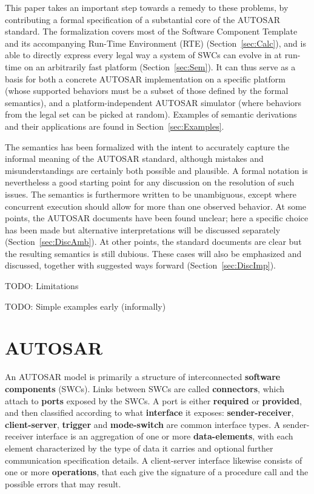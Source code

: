 \documentclass[twocolumn]{article}
\begin{document}
This paper takes an important step towards a remedy to these problems, by contributing a formal specification of a substantial core of the AUTOSAR standard. The formalization covers most of the Software Component Template and its accompanying Run-Time Environment (RTE) (Section~\ref{sec:Calc}), and is able to directly express every legal way a system of SWCs can evolve in at run-time on an arbitrarily fast platform (Section~\ref{sec:Sem}). It can thus serve as a basis for both a concrete AUTOSAR implementation on a specific platform (whose supported behaviors must be a subset of those defined by the formal semantics), and a platform-independent AUTOSAR simulator (where behaviors from the legal set can be picked at random). Examples of semantic derivations and their applications are found in Section~\ref{sec:Examples}.

The semantics has been formalized with the intent to accurately capture the informal meaning of the AUTOSAR standard, although mistakes and misunderstandings are certainly both possible and plausible. A formal notation is nevertheless a good starting point for any discussion on the resolution of such issues. The semantics is furthermore written to be unambiguous, except where concurrent execution should allow for more than one observed behavior. At some points, the AUTOSAR documents have been found unclear; here a specific choice has been made but alternative interpretations will be discussed separately (Section~\ref{sec:DiscAmb}). At other points, the standard documents are clear but the resulting semantics is still dubious. These cases will also be emphasized and discussed, together with suggested ways forward (Section~\ref{sec:DiscImp}).


TODO: Limitations

TODO: Simple examples early (informally)

\section{AUTOSAR}
\label{sec:autosar}

An AUTOSAR model is primarily a structure of interconnected {\bf software components} (SWCs). Links between SWCs are called {\bf connectors}, which attach to {\bf ports} exposed by the SWCs. A port is either {\bf required} or {\bf provided}, and then classified according to what {\bf interface} it exposes: {\bf sender-receiver}, {\bf client-server}, {\bf trigger} and {\bf mode-switch} are common interface types. A sender-receiver interface is an aggregation of one or more {\bf data-elements}, with each element characterized by the type of data it carries and optional further communication specification details. A client-server interface likewise consists of one or more {\bf operations}, that each give the signature of a procedure call and the possible errors that may result.
\end{document}
